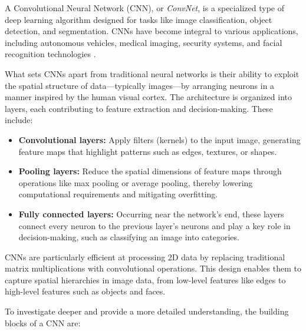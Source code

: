 A Convolutional Neural Network (CNN), or \textit{ConvNet}, is a specialized type of deep learning algorithm designed for tasks like image classification, object detection, and segmentation. CNNs have become integral to various applications, including autonomous vehicles, medical imaging, security systems, and facial recognition technologies \cite{DBLP:journals/corr/OSheaN15}. 

What sets CNNs apart from traditional neural networks is their ability to exploit the spatial structure of data—typically images—by arranging neurons in a manner inspired by the human visual cortex. The architecture is organized into layers, each contributing to feature extraction and decision-making. These include:

\begin{itemize}
    \item \textbf{Convolutional layers:} Apply filters (kernels) to the input image, generating feature maps that highlight patterns such as edges, textures, or shapes.
    \item \textbf{Pooling layers:} Reduce the spatial dimensions of feature maps through operations like max pooling or average pooling, thereby lowering computational requirements and mitigating overfitting.
    \item \textbf{Fully connected layers:} Occurring near the network's end, these layers connect every neuron to the previous layer's neurons and play a key role in decision-making, such as classifying an image into categories.
\end{itemize}

CNNs are particularly efficient at processing 2D data by replacing traditional matrix multiplications with convolutional operations. This design enables them to capture spatial hierarchies in image data, from low-level features like edges to high-level features such as objects and faces.

To investigate deeper and provide a more detailed understanding, the building blocks of a CNN are:

